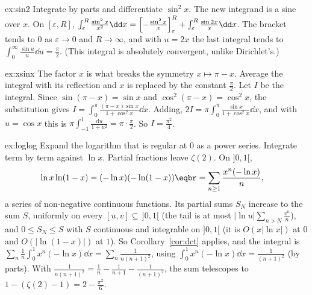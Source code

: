\begin{solution}{ex:sin2}
\idea Integrate by parts and differentiate $\sin^2x$. The new integrand is a sine over $x$.
\writeup On $[\varepsilon,R]$, $\int_\varepsilon^R\frac{\sin^2x}{x^2}\dd x=\Bigl[-\frac{\sin^2x}x\Bigr]_\varepsilon^R+\int_\varepsilon^R\frac{\sin2x}x\dd x$. The bracket tends to
$0$ as $\varepsilon\to0$ and $R\to\infty$, and with $u=2x$ the last integral tends to $\int_0^\infty\frac{\sin u}u\dd u=\frac\pi2$. (This integral is
absolutely convergent, unlike Dirichlet's.)
\end{solution}

\begin{solution}{ex:xsinx}
\idea The factor $x$ is what breaks the symmetry $x\mapsto\pi-x$. Average the integral with its reflection and $x$ is replaced by the constant $\frac\pi2$.
\writeup Let $I$ be the integral. Since $\sin(\pi-x)=\sin x$ and $\cos^2(\pi-x)=\cos^2x$, the substitution gives
$I=\int_0^\pi\frac{(\pi-x)\sin x}{1+\cos^2x}\dd x$. Adding, $2I=\pi\int_0^\pi\frac{\sin x}{1+\cos^2x}\dd x$, and with $u=\cos x$ this is
$\pi\int_{-1}^1\frac{\mathrm du}{1+u^2}=\pi\cdot\frac\pi2$. So $I=\frac{\pi^2}4$.
\end{solution}

\begin{solution}{ex:loglog}
\idea Expand the logarithm that is regular at $0$ as a power series. Integrate term by term against $\ln x$. Partial fractions leave $\zeta(2)$.
\writeup On $]0,1[$,
\[
\begin{aligned}\ln x\ln(1-x)&=(-\ln x)(-\ln(1-x))\eqbr=\sum_{n\ge1}\frac{x^n(-\ln x)}n,\end{aligned}
\]
a series of non-negative continuous functions. Its partial sums $S_N$ increase to the sum $S$, uniformly on every $[u,v]\subseteq\,]0,1[$ (the tail is at most
$|\ln u|\sum_{n>N}\frac{v^n}n$), and $0\le S_N\le S$ with $S$ continuous and integrable on $]0,1[$ (it is $O(x|\ln x|)$ at $0$ and $O(|\ln(1-x)|)$
at $1$). So Corollary~\ref{cor:dct} applies, and the integral is $\sum_n\frac1n\int_0^1x^n(-\ln x)\dd x=\sum_n\frac1{n(n+1)^2}$, using $\int_0^1x^n(-\ln x)\dd x=\frac1{(n+1)^2}$ (by parts).
With $\frac1{n(n+1)^2}=\frac1n-\frac1{n+1}-\frac1{(n+1)^2}$, the sum telescopes to $1-(\zeta(2)-1)=2-\frac{\pi^2}6$.
\end{solution}

